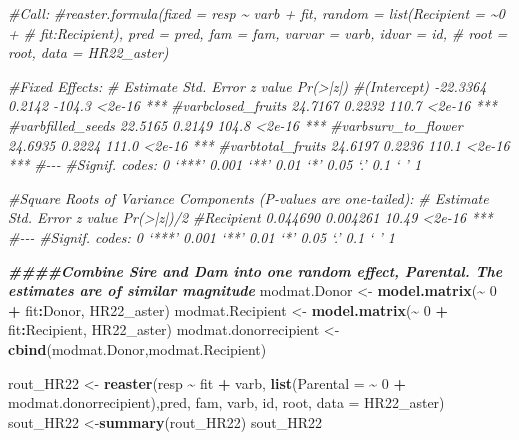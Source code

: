 \documentclass[
]{article}
\newenvironment{Shaded}{\begin{snugshade}}{\end{snugshade}}
\newcommand{\AttributeTok}[1]{\textcolor[rgb]{0.13,0.29,0.53}{#1}}
\newcommand{\CommentTok}[1]{\textcolor[rgb]{0.56,0.35,0.01}{\textit{#1}}}
\newcommand{\DecValTok}[1]{\textcolor[rgb]{0.00,0.00,0.81}{#1}}
\newcommand{\DocumentationTok}[1]{\textcolor[rgb]{0.56,0.35,0.01}{\textbf{\textit{#1}}}}
\newcommand{\FunctionTok}[1]{\textcolor[rgb]{0.13,0.29,0.53}{\textbf{#1}}}
\newcommand{\NormalTok}[1]{#1}
\newcommand{\OtherTok}[1]{\textcolor[rgb]{0.56,0.35,0.01}{#1}}
\newcommand{\SpecialCharTok}[1]{\textcolor[rgb]{0.81,0.36,0.00}{\textbf{#1}}}
\begin{document}
\begin{Shaded}
\begin{Highlighting}[]
\CommentTok{\#Call:}
\CommentTok{\#reaster.formula(fixed = resp \textasciitilde{} varb + fit, random = list(Recipient = \textasciitilde{}0 + }
\CommentTok{\#    fit:Recipient), pred = pred, fam = fam, varvar = varb, idvar = id, }
\CommentTok{\#    root = root, data = HR22\_aster)}

\CommentTok{\#Fixed Effects:}
\CommentTok{\#                   Estimate Std. Error z value Pr(\textgreater{}|z|)    }
\CommentTok{\#(Intercept)        {-}22.3364     0.2142  {-}104.3   \textless{}2e{-}16 ***}
\CommentTok{\#varbclosed\_fruits   24.7167     0.2232   110.7   \textless{}2e{-}16 ***}
\CommentTok{\#varbfilled\_seeds    22.5165     0.2149   104.8   \textless{}2e{-}16 ***}
\CommentTok{\#varbsurv\_to\_flower  24.6935     0.2224   111.0   \textless{}2e{-}16 ***}
\CommentTok{\#varbtotal\_fruits    24.6197     0.2236   110.1   \textless{}2e{-}16 ***}
\CommentTok{\#{-}{-}{-}}
\CommentTok{\#Signif. codes:  0 ‘***’ 0.001 ‘**’ 0.01 ‘*’ 0.05 ‘.’ 0.1 ‘ ’ 1}

\CommentTok{\#Square Roots of Variance Components (P{-}values are one{-}tailed):}
\CommentTok{\#          Estimate Std. Error z value Pr(\textgreater{}|z|)/2    }
\CommentTok{\#Recipient 0.044690   0.004261   10.49     \textless{}2e{-}16 ***}
\CommentTok{\#{-}{-}{-}}
\CommentTok{\#Signif. codes:  0 ‘***’ 0.001 ‘**’ 0.01 ‘*’ 0.05 ‘.’ 0.1 ‘ ’ 1}

\DocumentationTok{\#\#\#\#Combine Sire and Dam into one random effect, \textasciigrave{}Parental\textasciigrave{}. The estimates are of similar magnitude }
\NormalTok{modmat.Donor }\OtherTok{\textless{}{-}} \FunctionTok{model.matrix}\NormalTok{(}\SpecialCharTok{\textasciitilde{}} \DecValTok{0} \SpecialCharTok{+}\NormalTok{ fit}\SpecialCharTok{:}\NormalTok{Donor, HR22\_aster)}
\NormalTok{modmat.Recipient }\OtherTok{\textless{}{-}} \FunctionTok{model.matrix}\NormalTok{(}\SpecialCharTok{\textasciitilde{}} \DecValTok{0} \SpecialCharTok{+}\NormalTok{ fit}\SpecialCharTok{:}\NormalTok{Recipient, HR22\_aster)}
\NormalTok{modmat.donorrecipient }\OtherTok{\textless{}{-}} \FunctionTok{cbind}\NormalTok{(modmat.Donor,modmat.Recipient)}

\NormalTok{rout\_HR22 }\OtherTok{\textless{}{-}} \FunctionTok{reaster}\NormalTok{(resp }\SpecialCharTok{\textasciitilde{}}\NormalTok{ fit }\SpecialCharTok{+}\NormalTok{ varb, }\FunctionTok{list}\NormalTok{(}\AttributeTok{Parental =} \SpecialCharTok{\textasciitilde{}} \DecValTok{0} \SpecialCharTok{+}\NormalTok{ modmat.donorrecipient),pred, fam, varb, id, root, }\AttributeTok{data =}\NormalTok{ HR22\_aster)}
\NormalTok{sout\_HR22 }\OtherTok{\textless{}{-}}\FunctionTok{summary}\NormalTok{(rout\_HR22)}
\NormalTok{sout\_HR22}
\end{Highlighting}
\end{Shaded}
\end{document}
